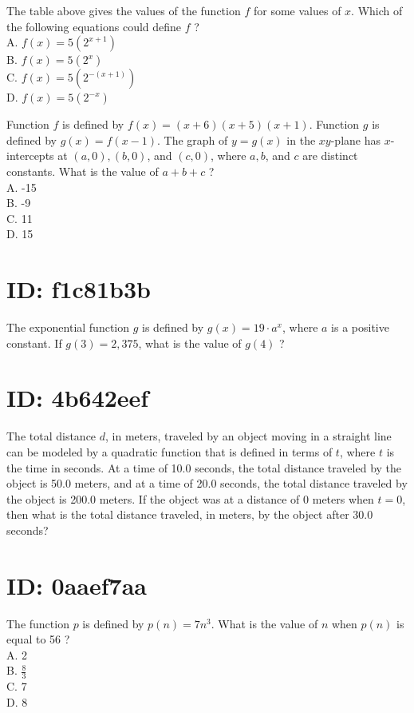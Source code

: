 The table above gives the values of the function $f$ for some values of $x$. Which of the following equations could define $f$ ?\\
A. $f(x)=5\left(2^{x+1}\right)$\\
B. $f(x)=5\left(2^{x}\right)$\\
C. $f(x)=5\left(2^{-(x+1)}\right)$\\
D. $f(x)=5\left(2^{-x}\right)$

Function $f$ is defined by $f(x)=(x+6)(x+5)(x+1)$. Function $g$ is defined by $g(x)=f(x-1)$. The graph of $y=g(x)$ in the $x y$-plane has $x$-intercepts at $(a, 0),(b, 0)$, and $(c, 0)$, where $a, b$, and $c$ are distinct constants. What is the value of $a+b+c$ ?\\
A. -15\\
B. -9\\
C. 11\\
D. 15

\section*{ID: f1c81b3b}
The exponential function $g$ is defined by $g(x)=19 \cdot a^{x}$, where $a$ is a positive constant. If $g(3)=2,375$, what is the value of $g(4)$ ?

\section*{ID: 4b642eef}
The total distance $d$, in meters, traveled by an object moving in a straight line can be modeled by a quadratic function that is defined in terms of $t$, where $t$ is the time in seconds. At a time of 10.0 seconds, the total distance traveled by the object is 50.0 meters, and at a time of 20.0 seconds, the total distance traveled by the object is 200.0 meters. If the object was at a distance of 0 meters when $t=0$, then what is the total distance traveled, in meters, by the object after 30.0 seconds?

\section*{ID: 0aaef7aa}
The function $p$ is defined by $p(n)=7 n^{3}$. What is the value of $n$ when $p(n)$ is equal to 56 ?\\
A. 2\\
B. $\frac{8}{3}$\\
C. 7\\
D. 8

